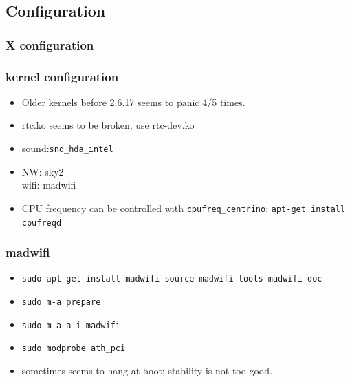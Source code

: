 \documentclass[cjk,dvipdfm]{beamer}
\begin{document}
\subsection{Configuration}

\begin{frame}
 \frametitle{X configuration}
\end{frame}

\begin{frame}
 \frametitle{kernel configuration}
\begin{itemize}
 \item Older kernels before 2.6.17 seems to panic 4/5 times.
 \item rtc.ko seems to be broken, use rtc-dev.ko
 \item sound:\texttt{snd\_hda\_intel}
 \item NW: sky2\\
       wifi: madwifi
 \item CPU frequency can be controlled with \texttt{cpufreq\_centrino};
       \texttt{apt-get install cpufreqd}
\end{itemize}
\end{frame}

\begin{frame}
 \frametitle{madwifi}
 \begin{itemize}
  \item \texttt{sudo apt-get install madwifi-source madwifi-tools madwifi-doc}
  \item \texttt{sudo m-a prepare}
  \item \texttt{sudo m-a a-i madwifi}
  \item \texttt{sudo modprobe ath\_pci}
  \item<2-> sometimes seems to hang at boot; stability is not too good.
 \end{itemize}
\end{frame}
\end{document}
